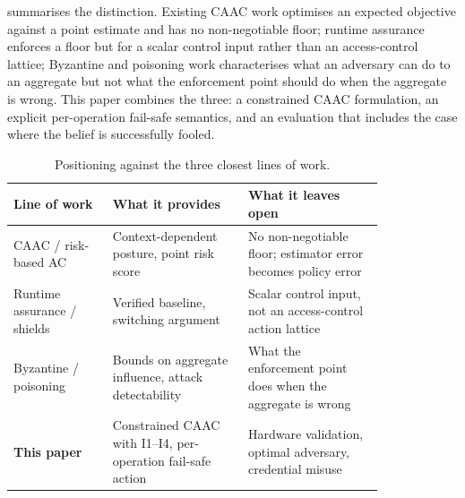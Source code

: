  summarises the distinction. Existing CAAC work optimises
an expected objective against a point estimate and has no non-negotiable floor;
runtime assurance enforces a floor but for a scalar control input rather than an
access-control lattice; Byzantine and poisoning work characterises what an
adversary can do to an aggregate but not what the enforcement point should do
when the aggregate is wrong. This paper combines the three: a constrained CAAC
formulation, an explicit per-operation fail-safe semantics, and an evaluation
that includes the case where the belief is successfully fooled.

\begin{table}[t]
\centering
\small
\caption{Positioning against the three closest lines of work.}
\label{tab:positioning}
\begin{tabular}{p{0.22\linewidth}p{0.30\linewidth}p{0.30\linewidth}}
\toprule
Line of work & What it provides & What it leaves open \\
\midrule
CAAC / risk-based AC
& Context-dependent posture, point risk score
& No non-negotiable floor; estimator error becomes policy error \\
Runtime assurance / shields
& Verified baseline, switching argument
& Scalar control input, not an access-control action lattice \\
Byzantine / poisoning
& Bounds on aggregate influence, attack detectability
& What the enforcement point does when the aggregate is wrong \\
\textbf{This paper}
& Constrained CAAC with I1--I4, per-operation fail-safe action
& Hardware validation, optimal adversary, credential misuse \\
\bottomrule
\end{tabular}
\end{table}
